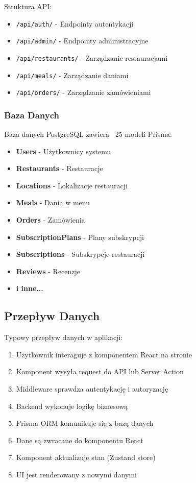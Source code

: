 \documentclass[12pt,a4paper,utf-8]{article}
\begin{document}
Struktura API:
\begin{itemize}
    \item \texttt{/api/auth/}  -  Endpointy autentykacji
    \item \texttt{/api/admin/}  -  Endpointy administracyjne
    \item \texttt{/api/restaurants/}  -  Zarządzanie restauracjami
    \item \texttt{/api/meals/}  -  Zarządzanie daniami
    \item \texttt{/api/orders/}  -  Zarządzanie zamówieniami
\end{itemize}

\subsubsection{Baza Danych}

Baza danych PostgreSQL zawiera ~25 modeli Prisma:

\begin{itemize}
    \item \textbf{Users}  -  Użytkownicy systemu
    \item \textbf{Restaurants}  -  Restauracje
    \item \textbf{Locations}  -  Lokalizacje restauracji
    \item \textbf{Meals}  -  Dania w menu
    \item \textbf{Orders}  -  Zamówienia
    \item \textbf{SubscriptionPlans}  -  Plany subskrypcji
    \item \textbf{Subscriptions}  -  Subskrypcje restauracji
    \item \textbf{Reviews}  -  Recenzje
    \item \textbf{i inne...}
\end{itemize}

\subsection{Przepływ Danych}

Typowy przepływ danych w aplikacji:

\begin{enumerate}
    \item Użytkownik interaguje z komponentem React na stronie
    \item Komponent wysyła request do API lub Server Action
    \item Middleware sprawdza autentykację i autoryzację
    \item Backend wykonuje logikę biznesową
    \item Prisma ORM komunikuje się z bazą danych
    \item Dane są zwracane do komponentu React
    \item Komponent aktualizuje stan (Zustand store)
    \item UI jest renderowany z nowymi danymi
\end{enumerate}
\end{document}
